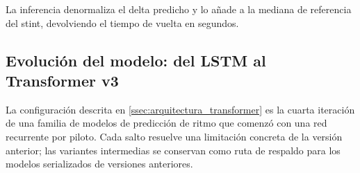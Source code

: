 La inferencia denormaliza el delta predicho y lo añade a la mediana de referencia del stint, devolviendo el tiempo de vuelta en segundos.

\subsection{Evolución del modelo: del LSTM al Transformer v3}
\label{ssec:evolucion_transformer}

La configuración descrita en \ref{ssec:arquitectura_transformer} es la cuarta iteración de una familia de modelos de predicción de ritmo que comenzó con una red recurrente por piloto. Cada salto resuelve una limitación concreta de la versión anterior; las variantes intermedias se conservan como ruta de respaldo para los modelos serializados de versiones anteriores.

